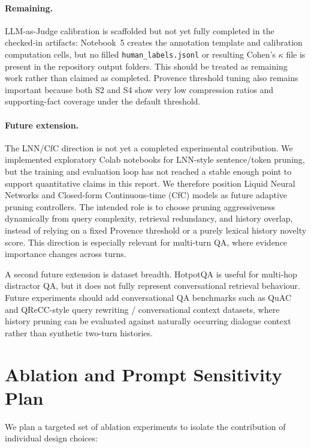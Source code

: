 \documentclass[11pt,a4paper]{article}
\begin{document}
\paragraph{Remaining.}
LLM-as-Judge calibration is scaffolded but not yet fully completed in the checked-in artifacts: Notebook~5 creates the annotation template and calibration computation cells, but no filled \texttt{human\_labels.jsonl} or resulting Cohen's $\kappa$ file is present in the repository output folders. This should be treated as remaining work rather than claimed as completed. Provence threshold tuning also remains important because both S2 and S4 show very low compression ratios and supporting-fact coverage under the default threshold.

\paragraph{Future extension.}
The LNN/CfC direction is not yet a completed experimental contribution. We implemented exploratory Colab notebooks for LNN-style sentence/token pruning, but the training and evaluation loop has not reached a stable enough point to support quantitative claims in this report. We therefore position Liquid Neural Networks and Closed-form Continuous-time (CfC) models as future adaptive pruning controllers. The intended role is to choose pruning aggressiveness dynamically from query complexity, retrieval redundancy, and history overlap, instead of relying on a fixed Provence threshold or a purely lexical history novelty score. This direction is especially relevant for multi-turn QA, where evidence importance changes across turns.

A second future extension is dataset breadth. HotpotQA is useful for multi-hop distractor QA, but it does not fully represent conversational retrieval behaviour. Future experiments should add conversational QA benchmarks such as QuAC and QReCC-style query rewriting / conversational context datasets, where history pruning can be evaluated against naturally occurring dialogue context rather than synthetic two-turn histories.

\section{Ablation and Prompt Sensitivity Plan}
\label{sec:ablation}

We plan a targeted set of ablation experiments to isolate the contribution of individual design choices:
\end{document}
